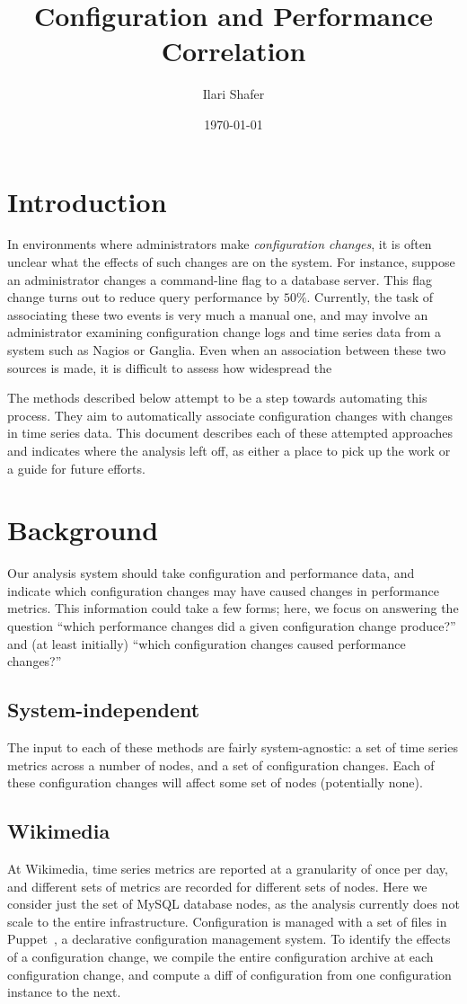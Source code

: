 \documentclass[twocolumn]{article}
\title{Configuration and Performance Correlation}
\author{Ilari Shafer}
\date{\today}
\begin{document}
\maketitle

\section{Introduction}

In environments where administrators make \textit{configuration changes}, it is often unclear what the effects of such changes are on the system. For instance, suppose an administrator changes a command-line flag to a database server. This flag change turns out to reduce query performance by $50\%$. Currently, the task of associating these two events is very much a manual one, and may involve an administrator examining configuration change logs and time series data from a system such as Nagios or Ganglia. Even when an association between these two sources is made, it is difficult to assess how widespread the 

The methods described below attempt to be a step towards automating this process. They aim to automatically associate configuration changes with changes in time series data. This document describes each of these attempted approaches and indicates where the analysis left off, as either a place to pick up the work or a guide for future efforts.

\section{Background}
Our analysis system should take configuration and performance data, and indicate which configuration changes may have caused changes in performance metrics. This information could take a few forms; here, we focus on answering the question ``which performance changes did a given configuration change produce?'' and (at least initially) ``which configuration changes caused performance changes?''

\subsection{System-independent}
The input to each of these methods are fairly system-agnostic: a set of time series metrics across a number of nodes, and a set of configuration changes. Each of these configuration changes will affect some set of nodes (potentially none).

\subsection{Wikimedia}
At Wikimedia, time series metrics are reported at a granularity of once per day, and different sets of metrics are recorded for different sets of nodes. Here we consider just the set of MySQL database nodes, as the analysis currently does not scale to the entire infrastructure. Configuration is managed with a set of files in Puppet~\cite{puppet}, a declarative configuration management system. To identify the effects of a configuration change, we compile the entire configuration archive at each configuration change, and compute a diff of configuration from one configuration instance to the next.
\end{document}
